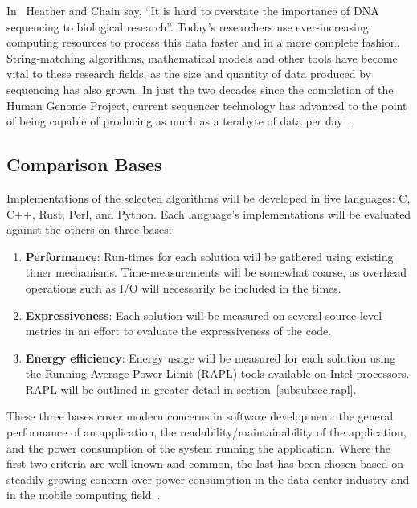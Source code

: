 In~\cite{heather} Heather and Chain say, ``It is hard to overstate the importance of DNA sequencing to biological research''. Today's researchers use ever-increasing computing resources to process this data faster and in a more complete fashion. String-matching algorithms, mathematical models and other tools have become vital to these research fields, as the size and quantity of data produced by sequencing has also grown. In just the two decades since the completion of the Human Genome Project, current sequencer technology has advanced to the point of being capable of producing as much as a terabyte of data per day~\cite{cabral}.

\subsection{Comparison Bases}
\label{subsec:comparison}

Implementations of the selected algorithms will be developed in five languages: C, C++, Rust, Perl, and Python. Each language's implementations will be evaluated against the others on three bases:

\begin{enumerate}
\item \textbf{Performance}: Run-times for each solution will be gathered using existing timer mechanisms. Time-measurements will be somewhat coarse, as overhead operations such as I/O will necessarily be included in the times.
\item \textbf{Expressiveness}: Each solution will be measured on several source-level metrics in an effort to evaluate the expressiveness of the code.
\item \textbf{Energy efficiency}: Energy usage will be measured for each solution using the Running Average Power Limit (RAPL) tools available on Intel processors. RAPL will be outlined in greater detail in section~\ref{subsubsec:rapl}.
\end{enumerate}

These three bases cover modern concerns in software development: the general performance of an application, the readability/maintainability of the application, and the power consumption of the system running the application. Where the first two criteria are well-known and common, the last has been chosen based on steadily-growing concern over power consumption in the data center industry and in the mobile computing field~\cite{pereira}.
